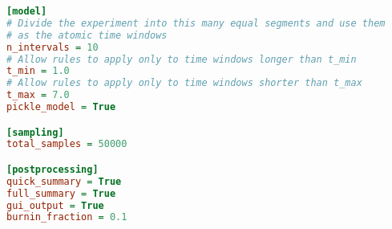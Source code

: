 \documentclass[12pt]{report}
\begin{document}
\begin{lstlisting}[language=Ini,caption=Template MITRE configuration file,numbers=none]
[model]
# Divide the experiment into this many equal segments and use them
# as the atomic time windows
n_intervals = 10
# Allow rules to apply only to time windows longer than t_min
t_min = 1.0
# Allow rules to apply only to time windows shorter than t_max
t_max = 7.0
pickle_model = True

[sampling]
total_samples = 50000

[postprocessing]
quick_summary = True
full_summary = True
gui_output = True
burnin_fraction = 0.1
\end{lstlisting}
\end{document}
